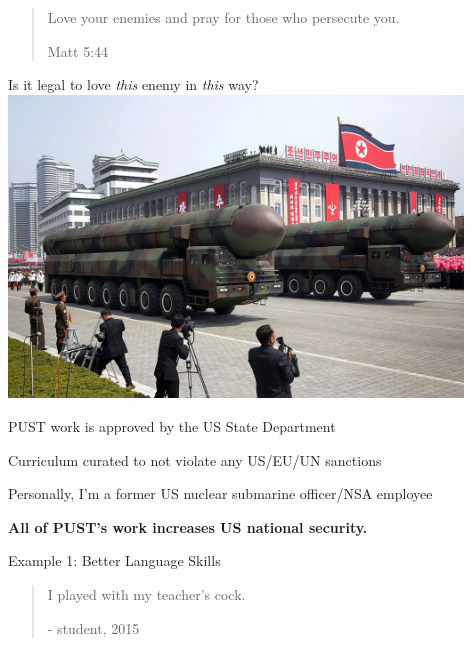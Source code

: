 \documentclass{beamer}
\begin{document}
\begin{frame}{}
\LARGE
    \begin{quote}
        {\color{red}
    Love your enemies and pray for those who persecute you.
        }
    
    Matt 5:44
    \end{quote}


\end{frame}{}

\begin{frame}{Is it legal to love \emph{this} enemy in \emph{this} way?}
\includegraphics[width=4.75in,clip,trim=0 0.3in 0 0.3in]{img/parade}

\vspace{0.1in}
PUST work is approved by the US State Department

\vspace{0.1in}
Curriculum curated to not violate any US/EU/UN sanctions

\vspace{0.1in}
Personally, I'm a former US nuclear submarine officer/NSA employee

\pause
\vspace{0.1in}
\textbf{All of PUST's work increases US national security.
}
\end{frame}

\begin{frame}{Example 1: Better Language Skills}
    \begin{quote}
        \Large

        I played with my teacher's cock.

        \vspace{0.2in}
        - student, 2015
    \end{quote}
\end{frame}
\end{document}
